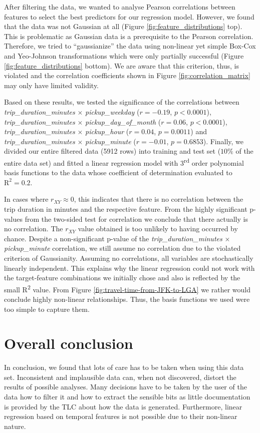 \documentclass{article}
\begin{document}
After filtering the data, we wanted to analyse Pearson correlations between features to select the best predictors for our regression model. However, we found that the data was not Gaussian at all (Figure \ref{fig:feature_distributions} top). This is problematic as Gaussian data is a prerequisite to the Pearson correlation. Therefore, we tried to ``gaussianize'' the data using non-linear yet simple Box-Cox and Yeo-Johnson transformations which were only partially successful (Figure \ref{fig:feature_distributions} bottom). We are aware that this criterion, thus, is violated and the correlation coefficients shown in Figure \ref{fig:correlation_matrix} may only have limited validity.

Based on these results, we tested the significance of the correlations between \emph{trip\_duration\_minutes} \(\times\) \emph{pickup\_weekday} (\(r = -0.19\), \(p<0.0001\)), \emph{trip\_duration\_minutes} \(\times\) \emph{pickup\_day\_of\_month} (\(r = 0.06\), \(p<0.0001\)), \emph{trip\_duration\_minutes} \(\times\) \emph{pickup\_hour} (\(r = 0.04\), \(p= 0.0011\)) and \emph{trip\_duration\_minutes} \(\times\) \emph{pickup\_minute} (\(r = -0.01\), \(p=0.6853\)).
Finally, we divided our entire filtered data (5912 rows) into training and test set (\(10\%\) of the entire data set) and fitted a linear regression model with 3\textsuperscript{rd} order polynomial basis functions to the data whose coefficient of determination evaluated to \(\textrm{R}^2=0.2\).

In cases where \(r_{XY} \approx 0\), this indicates that there is no correlation between the trip duration in minutes and the respective feature. From the highly significant p-values from the two-sided test for correlation we conclude that there actually is no correlation. The \(r_{XY}\) value obtained is too unlikely to having occurred by chance. Despite a non-significant p-value of the \emph{trip\_duration\_minutes} \(\times\) \emph{pickup\_minute} correlation, we still assume no correlation due to the violated criterion of Gaussianity. Assuming no correlations, all variables are stochastically linearly independent. This explains why the linear regression could not work with the target-feature combinations we initially chose and also is reflected by the small R\textsuperscript{2} value. From Figure \ref{fig:travel-time-from-JFK-to-LGA}  we rather would conclude highly non-linear relationships. Thus, the basis functions we used were too simple to capture them.

\section{Overall conclusion}
In conclusion, we found that lots of care has to be taken when using this data set. Inconsistent and implausible data can, when not discovered, distort the results of possible analyses. Many decisions have to be taken by the user of the data how to filter it and how to extract the sensible bits as little documentation is provided by the TLC \cite{tlc} about how the data is generated. Furthermore, linear regression based on temporal features is not possible due to their non-linear nature.
\end{document}
